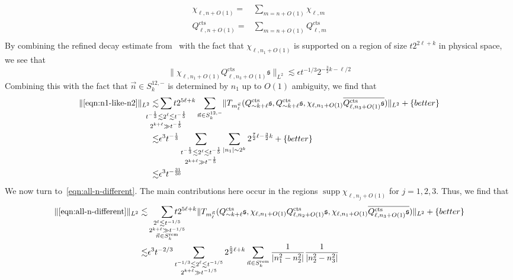 \documentclass[letterpaper, reqno,final]{amsart}
\DeclareMathOperator{\supp}{supp}
\newcommand{\fs}{\mathfrak{s}}
\newcommand{\tcts}{\text{cts}}
\newcommand{\btext}[1]{\left\{\textup{#1}\right\}}
\newcommand{\bbetter}{\btext{better}}
\begin{document}
\begin{equation*}\begin{split}
    \chi_{\ell, n + O(1)} =& \sum_{m = n + O(1)} \chi_{\ell, m}\\
    Q^\tcts_{\ell,n + O(1)} =& \sum_{m = n + O(1)} Q^\tcts_{\ell,m}\\
\end{split}\end{equation*}
By combining the refined decay estimate from~ with the fact that $\chi_{\ell, n_1 + O(1)}$ is supported on a region of size $t 2^{2\ell + k}$ in physical space, we see that
\begin{equation*}
    \lVert \chi_{\ell, n_1 + O(1)}Q^\tcts_{\ell,n_3 + O(1)} \fs \rVert_{L^2} \lesssim \epsilon t^{-1/3} 2^{-\frac{3}{2}k-\ell/2}
\end{equation*}
Combining this with the fact that $\vec{n} \in S^{12,-}_k$ is determined by $n_1$ up to $O(1)$ ambiguity, we find that
\begin{equation*}\begin{split}
    \lVert \eqref{eqn:n1-like-n2} \rVert_{L^2} \lesssim& \smashoperator[lr]{\sum_{\substack{t^{-\frac{1}{3}} \lesssim 2^{\ell} \lesssim t^{-\frac{1}{5}}\\2^{k+\ell} \gg t^{-\frac{1}{5}}}}} t 2^{5\ell+k} \sum_{\vec{n} \in S^{12,-}_k}  \lVert T_{m_{\ell}^{\vec{n}}} (Q^{\tcts}_{\sim k + \ell} \fs, Q^{\tcts}_{\sim k + \ell} \fs, \chi_{\ell, n_1 + O(1)} \overline{Q^\tcts_{\ell, n_3 + O(1)} \fs})\rVert_{L^2} + \bbetter\\
    \lesssim& \epsilon^3 t^{-\frac{1}{3}} \sum_{\crampedsubstack{t^{-\frac{1}{3}} \lesssim 2^\ell \lesssim t^{-\frac{1}{5}}\\2^{k+\ell} \gg t^{-\frac{1}{5}}}}\sum_{|n_1| \sim 2^k} 2^{\frac{7}{2}\ell - \frac{3}{2}k} + \bbetter\\
    \lesssim& \epsilon^3 t^{-\frac{31}{30}}
\end{split}\end{equation*}
We now turn to~\eqref{eqn:all-n-different}.  The main contributions here occur in the regions $\supp \chi_{\ell, n_j + O(1)}$ for $j = 1,2,3$.  Thus, we find that
\begin{equation*}\begin{split}
    \lVert \eqref{eqn:all-n-different} \rVert_{L^2} \lesssim& \smashoperator[r]{\sum_{\crampedsubstack{2^\ell \lesssim t^{-1/5}\\ 2^{k+\ell} \gg t^{-1/5}\\ \vec{n} \in S^{\text{rem}}_k}}} t 2^{5\ell + k} \lVert T_{m_\ell^{\vec{n}}} (Q^\tcts_{\sim k + \ell} \fs, \chi_{\ell, n_1 + O(1)} Q^\tcts_{\ell, n_2 + O(1)} \fs, \chi_{\ell, n_1 + O(1)} \overline{Q^\tcts_{\ell, n_3 + O(1)} \fs} ) \rVert_{L^2} + \bbetter\\
    \lesssim& \epsilon^3 t^{-2/3} \sum_{\substack{t^{-1/3} \lesssim 2^\ell \lesssim t^{-1/5}\\ 2^{k+\ell} \gg t^{-1/5}}} 2^{\frac{5}{2}\ell + k} \sum_{\vec{n} \in S^{\text{rem}}_k} \frac{1}{|n_1^2 - n_2^2|} \frac{1}{|n_2^2 - n_3^2|}
\end{split}\end{equation*}
\end{document}

